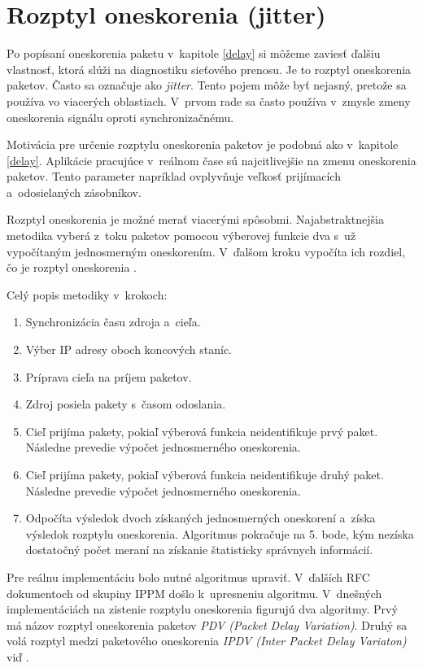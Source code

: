 \section{Rozptyl oneskorenia (jitter)} \label{jitter}
Po popísaní oneskorenia paketu v~kapitole \ref{delay} si môžeme 
zaviesť ďalšiu vlastnosť, ktorá slúži na diagnostiku sieťového prenosu. Je to 
rozptyl oneskorenia paketov. Často sa označuje ako \emph{jitter}. Tento pojem 
môže byť nejasný, pretože sa používa vo viacerých oblastiach. V~prvom rade sa
často používa v~zmysle zmeny oneskorenia signálu oproti synchronizačnému.

Motivácia pre určenie rozptylu oneskorenia paketov je podobná ako v~kapitole
\ref{delay}. Aplikácie pracujúce v~reálnom čase sú
najcitlivejšie na zmenu oneskorenia paketov.
Tento parameter napríklad ovplyvňuje veľkosť prijímacích a~odosielaných
zásobníkov.

Rozptyl oneskorenia je možné merať viacerými spôsobmi. Najabstraktnejšia
metodika vyberá z~toku paketov pomocou výberovej funkcie dva
s~už vypočítaným jednosmerným oneskorením. V~ďalšom kroku vypočíta ich rozdiel,
čo je rozptyl oneskorenia \cite{rfc_delay_variation_metric}.

\noindent Celý popis metodiky v~krokoch:
\begin{enumerate}
    \item Synchronizácia času zdroja a~cieľa.
    \item Výber IP adresy oboch koncových staníc.
    \item Príprava cieľa na príjem paketov.
    \item Zdroj posiela pakety s~časom odoslania.
    \item Cieľ prijíma pakety, pokiaľ výberová funkcia neidentifikuje
        prvý paket. Následne prevedie výpočet jednosmerného oneskorenia.
    \item Cieľ prijíma pakety, pokiaľ výberová funkcia neidentifikuje 
        druhý paket. Následne prevedie výpočet jednosmerného oneskorenia.
    \item Odpočíta výsledok dvoch získaných jednosmerných oneskorení a~získa 
        výsledok rozptylu oneskorenia. Algoritmus pokračuje na 5. bode, 
        kým nezíska dostatočný počet meraní na získanie štatisticky
        správnych informácií.
\end{enumerate}

Pre reálnu implementáciu bolo nutné algoritmus upraviť. V~ďalších RFC 
dokumentoch od skupiny IPPM došlo k~upresneniu algoritmu. V~dnešných
implementáciách na zistenie rozptylu oneskorenia figurujú dva algoritmy.
Prvý má názov rozptyl oneskorenia paketov \emph{PDV (Packet Delay
Variation)}. Druhý sa volá rozptyl medzi paketového oneskorenia \emph{IPDV
(Inter Packet Delay Variaton)} viď \cite{rfc_delay_variation_metric_2}.

